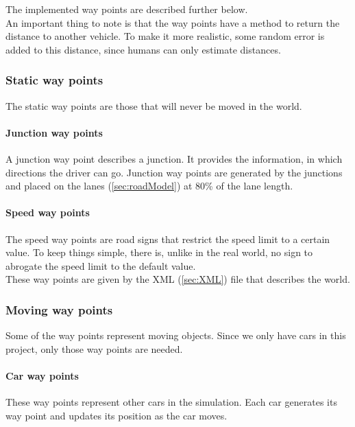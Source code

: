 \noindent The implemented way points are described further below. \\

\label{par:movingWPDistance}
\noindent An important thing to note is that the way points  have a method to 
return the distance to another vehicle. To make it more realistic, some random 
error is added to this distance, since humans can only estimate distances.

\subsubsection{Static way points}

The static way points are those that will never be moved in the world.

\paragraph{Junction way points}
A junction way point describes a junction. It provides the information, in
which directions the driver can go. Junction way points are generated by the
junctions and placed on the lanes (\ref{sec:roadModel}) at 80\% of the lane
length.

\paragraph{Speed way points}
The speed way points are road signs that restrict the speed limit to a certain
value. To keep things simple, there is, unlike in the real world, no sign to 
abrogate the speed limit to the default value. \\

\noindent These way points are given by the XML (\ref{sec:XML}) file that describes the 
world.

\subsubsection{Moving way points}

Some of the way points represent moving objects. Since we only have cars in this
project, only those way points are needed. \\

\paragraph{Car way points}
These way points represent other cars in the simulation. Each car generates its
way point and updates its position as the car moves.

